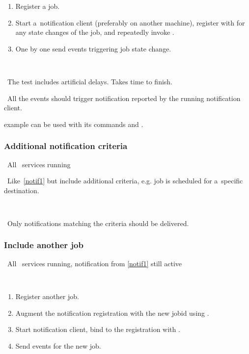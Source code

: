 \what
\begin{enumerate}
\item Register a job.
\item Start a~notification client (preferably on another machine),
register with  for any state changes of the job,
and repeatedly invoke .
\item One by one send events triggering job state change.
\end{enumerate}

\how\ 

\note\ The test includes artificial delays. Takes time to finish.

\result\ All the events should trigger notification reported by the running
notification client.

\begin{hints}
 example can be used with its commands  and .
\end{hints}



\subsubsection{Additional notification criteria}
\label{notif-complex}
\req\ All \LB\ services running

\what\ Like~\ref{notif1} but include additional criteria,
e.g. job is scheduled for a~specific destination.

\how\ 

\result\ Only notifications matching the criteria should be delivered.




\subsubsection{Include another job}
\label{notif2}
\req\ All \LB\ services running, notification from \ref{notif1} still active

\how\
\begin{enumerate}
\item Register another job.
\item Augment the notification registration with the new jobid using
\code{edg\_wll\_NotifChange}.
\item Start notification client, bind to the registration with
.
\item Send events for the new job.
\end{enumerate}

